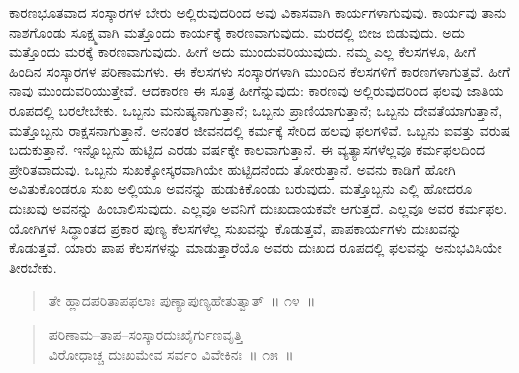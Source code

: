ಕಾರಣಭೂತವಾದ ಸಂಸ್ಕಾರಗಳ ಬೇರು ಅಲ್ಲಿರುವುದರಿಂದ ಅವು ವಿಕಾಸವಾಗಿ ಕಾರ್ಯಗಳಾಗುವುವು. ಕಾರ್ಯವು ತಾನು ನಾಶಗೊಂಡು ಸೂಕ್ಷ್ಮವಾಗಿ ಮತ್ತೊಂದು ಕಾರ್ಯಕ್ಕೆ ಕಾರಣವಾಗುವುದು. ಮರದಲ್ಲಿ ಬೀಜ ಬಿಡುವುದು. ಅದು ಮತ್ತೊಂದು ಮರಕ್ಕೆ ಕಾರಣವಾಗುವುದು. ಹೀಗೆ ಅದು ಮುಂದುವರಿಯುವುದು. ನಮ್ಮ ಎಲ್ಲ ಕೆಲಸಗಳೂ, ಹೀಗೆ ಹಿಂದಿನ ಸಂಸ್ಕಾರಗಳ ಪರಿಣಾಮಗಳು. ಈ ಕೆಲಸಗಳು ಸಂಸ್ಕಾರಗಳಾಗಿ ಮುಂದಿನ ಕೆಲಸಗಳಿಗೆ ಕಾರಣಗಳಾಗುತ್ತವೆ. ಹೀಗೆ ನಾವು ಮುಂದುವರಿಯುತ್ತೇವೆ. ಆದಕಾರಣ ಈ ಸೂತ್ರ ಹೀಗೆನ್ನುವುದು: ಕಾರಣವು ಅಲ್ಲಿರುವುದರಿಂದ ಫಲವು ಜಾತಿಯ ರೂಪದಲ್ಲಿ ಬರಲೇಬೇಕು. ಒಬ್ಬನು ಮನುಷ್ಯನಾಗುತ್ತಾನೆ; ಒಬ್ಬನು ಪ್ರಾಣಿಯಾಗುತ್ತಾನೆ; ಒಬ್ಬನು ದೇವತೆಯಾಗುತ್ತಾನೆ, ಮತ್ತೊಬ್ಬನು ರಾಕ್ಷಸನಾಗುತ್ತಾನೆ. ಅನಂತರ ಜೀವನದಲ್ಲಿ ಕರ್ಮಕ್ಕೆ ಸೇರಿದ ಹಲವು ಫಲಗಳಿವೆ. ಒಬ್ಬನು ಐವತ್ತು ವರುಷ ಬದುಕುತ್ತಾನೆ. ಇನ್ನೊಬ್ಬನು ಹುಟ್ಟಿದ ಎರಡು ವರ್ಷಕ್ಕೇ ಕಾಲವಾಗುತ್ತಾನೆ. ಈ ವ್ಯತ್ಯಾಸಗಳೆಲ್ಲವೂ ಕರ್ಮಫಲದಿಂದ ಪ್ರೇರಿತವಾದುವು. ಒಬ್ಬನು ಸುಖಕ್ಕೋಸ್ಕರವಾಗಿಯೇ ಹುಟ್ಟಿದನೆಂದು ತೋರುತ್ತಾನೆ. ಅವನು ಕಾಡಿಗೆ ಹೋಗಿ ಅವಿತುಕೊಂಡರೂ ಸುಖ ಅಲ್ಲಿಯೂ ಅವನನ್ನು ಹುಡುಕಿಕೊಂಡು ಬರುವುದು. ಮತ್ತೊಬ್ಬನು ಎಲ್ಲಿ ಹೋದರೂ ದುಃಖವು ಅವನನ್ನು ಹಿಂಬಾಲಿಸುವುದು. ಎಲ್ಲವೂ ಅವನಿಗೆ ದುಃಖದಾಯಕವೇ ಆಗುತ್ತದೆ. ಎಲ್ಲವೂ ಅವರ ಕರ್ಮಫಲ. ಯೋಗಿಗಳ ಸಿದ್ಧಾಂತದ ಪ್ರಕಾರ ಪುಣ್ಯ ಕೆಲಸಗಳೆಲ್ಲ ಸುಖವನ್ನು ಕೊಡುತ್ತವೆ, ಪಾಪಕಾರ್ಯಗಳು ದುಃಖವನ್ನು ಕೊಡುತ್ತವೆ. ಯಾರು ಪಾಪ ಕೆಲಸಗಳನ್ನು ಮಾಡುತ್ತಾರೆಯೊ ಅವರು ದುಃಖದ ರೂಪದಲ್ಲಿ ಫಲವನ್ನು ಅನುಭವಿಸಿಯೇ ತೀರಬೇಕು. 


\begin{verse}
ತೇ ಹ್ಲಾದಪರಿತಾಪಫಲಾಃ ಪುಣ್ಯಾಪುಣ್ಯಹೇತುತ್ವಾತ್​~॥ ೧೪~॥
\end{verse}




\begin{verse}
ಪರಿಣಾಮ–ತಾಪ–ಸಂಸ್ಕಾರದುಃಖೈರ್ಗುಣವೃತ್ತಿ\\ವಿರೋಧಾಚ್ಚ ದುಃಖಮೇವ ಸರ್ವಂ ವಿವೇಕಿನಃ~॥ ೧೫~॥
\end{verse}



